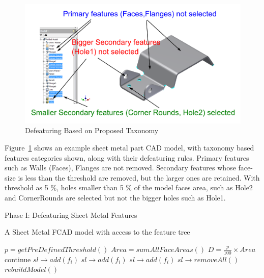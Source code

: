  	\begin{figure} [!h]
		\centering
		\includegraphics[width=0.62\linewidth]{images/SheetMetal_Ph1_Selection_Annotated_1.pdf}
		\caption{Defeaturing Based on Proposed Taxonomy }\label{fig:defeaturing:actions}
	\end{figure}
	
Figure~\ref{fig:defeaturing:actions} shows an example sheet metal part CAD model, with taxonomy based features categories shown, along with their defeaturing rules. Primary features such as Walls (Faces), Flanges are not removed. Secondary features whose face-size is less than the threshold are removed, but the larger ones are retained. With threshold as 5 \%, holes smaller than 5 \% of the model faces area, such as Hole2 and CornerRounds are selected but not the bigger holes such as Hole1.
 
 
\begin{algorithm}[H]
	\caption{Phase I: Defeaturing Sheet Metal Features}
	\label{alg:defeaturing:phase1}
	\begin{algorithmic}[1]
		\REQUIRE A Sheet Metal FCAD model with access to the feature tree
		
		\STATE $p = getPreDefinedThreshold()$
		\STATE $Area = sumAllFaceAreas()$
		\STATE $D = \frac{p}{100} \times Area$
				\STATE continue
				\STATE $sl \rightarrow add(f_i)$
			  		\STATE $sl \rightarrow add(f_i)$
				\ENDIF
			\ELSE
			  		\STATE $sl \rightarrow add(f_i)$
				\ENDIF				
			\ENDIF
		\ENDWHILE
		\STATE  $sl \rightarrow removeAll()$
		\STATE  $rebuildModel()$
	\end{algorithmic}
\end{algorithm}

